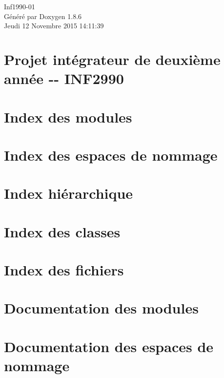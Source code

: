 \documentclass[twoside]{book}
\newcommand{\clearemptydoublepage}{%
  \newpage{\pagestyle{empty}\cleardoublepage}%
}
\begin{document}
\hypersetup{pageanchor=false}
\begin{titlepage}
\vspace*{7cm}
\begin{center}%
{\Large Inf1990-\/01 }\\
\vspace*{1cm}
{\large Généré par Doxygen 1.8.6}\\
\vspace*{0.5cm}
{\small Jeudi 12 Novembre 2015 14:11:39}\\
\end{center}
\end{titlepage}
\clearemptydoublepage
\tableofcontents
\clearemptydoublepage
{}
\hypersetup{pageanchor=true}

\chapter{Projet intégrateur de deuxième année -\/-\/ I\-N\-F2990}
\label{index}\hypertarget{index}{}
\chapter{Index des modules}

\chapter{Index des espaces de nommage}

\chapter{Index hiérarchique}

\chapter{Index des classes}

\chapter{Index des fichiers}

\chapter{Documentation des modules}





\chapter{Documentation des espaces de nommage}






\end{document}

